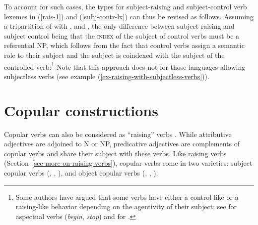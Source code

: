 \noindent
To account for such cases, the types for subject-raising and subject-control verb lexemes in
(\ref{rais-1}) and (\ref{subj-contr-lx}) can thus be revised  as follows. 
Assuming a tripartition of  with ,  and 
\citep[]{ps2}, 
the only difference between subject raising and subject control being that the \textsc{index} of the subject of control verbs must be a
referential NP, which follows from the fact that control verbs assign a semantic role to their
subject and the subject is coindexed with the subject of the controlled verb:\footnote{Some authors have argued that some verbs have either a control-like or a raising-like behavior depending on the agentivity of their subject; see  for  aspectual verbs (\emph{begin}, \emph{stop}) and  for .}
\eal
\ex {}  \impl {} 
\ex {} \impl \avm{ [\argst < \NPi, \ldots, [xarg & [ind & $i$ ]  ] > ] }
\zl
Note that this approach does not for those languages allowing subjectless verbs (see example (\ref{ex-raising-with-subjectless-verbs})).

\section{Copular constructions}
\label{sec-copular-constructions}

Copular verbs can also be considered as ``raising'' verbs \citep[]{Chomsky81a}.  While
attributive adjectives are adjoined to N or NP, predicative adjectives are complements of copular
verbs and share their subject with these verbs. Like raising verbs
(Section~\ref{sec-more-on-raising-verbs}), copular verbs come in two varieties: subject copular
verbs (, , ), and object copular verbs (,
, ).

